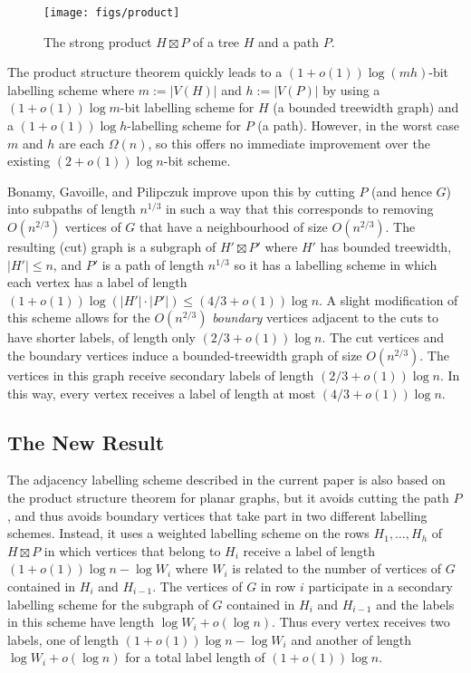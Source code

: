 \documentclass[kpfonts]{patmorin}
\let\le\leqslant
\begin{document}
\begin{figure}[htbp]
  \begin{center}
    \texttt{[image: figs/product]}
  \end{center}
  \caption{The strong product $H\boxtimes P$ of a tree $H$ and a path $P$.}
\end{figure}  

The product structure theorem quickly leads to a $(1+o(1))\log(mh)$-bit labelling scheme where $m:=|V(H)|$ and $h:=|V(P)|$ by using a $(1+o(1))\log m$-bit labelling scheme for $H$ (a bounded treewidth graph) and a $(1+o(1))\log h$-labelling scheme for $P$ (a path).  However, in the worst case $m$ and $h$ are each $\Omega(n)$, so this offers no immediate improvement over the existing $(2+o(1))\log n$-bit scheme.

Bonamy, Gavoille, and Pilipczuk improve upon this by cutting $P$ (and hence $G$) into subpaths of length $n^{1/3}$ in such a way that this corresponds to removing $O(n^{2/3})$ vertices of $G$ that have a neighbourhood of size $O(n^{2/3})$. The resulting (cut) graph is a subgraph of $H'\boxtimes P'$ where $H'$ has bounded treewidth, $|H'|\le n$, and $P'$ is a path of length $n^{1/3}$ so it has a labelling scheme in which each vertex has a label of length $(1+o(1))\log (|H'|\cdot|P'|) \le (4/3+o(1))\log n$.  A slight modification of this scheme allows for the $O(n^{2/3})$ \emph{boundary} vertices adjacent to the cuts to have shorter labels, of length only $(2/3+o(1))\log n$.  The cut vertices and the boundary vertices induce a bounded-treewidth graph of size $O(n^{2/3})$.  The vertices in this graph receive secondary labels of length $(2/3+o(1))\log n$.  In this way, every vertex receives a label of length at most $(4/3 + o(1))\log n$.

\subsection{The New Result}

The adjacency labelling scheme described in the current paper is also based on the product structure theorem for planar graphs, but it avoids cutting the path $P$, and thus avoids boundary vertices that take part in two different labelling schemes.  Instead, it uses a weighted labelling scheme on the rows $H_1,\ldots,H_h$ of $H\boxtimes P$ in which vertices that belong to $H_i$ receive a label of length $(1+o(1))\log n-\log W_i$ where $W_i$ is related to the number of vertices of $G$ contained in $H_i$ and $H_{i-1}$.  The vertices of $G$ in row $i$ participate in a secondary labelling scheme for the subgraph of $G$ contained in $H_i$ and $H_{i-1}$ and the labels in this scheme have length $\log W_i + o(\log n)$. Thus every vertex receives two labels, one of length $(1+o(1))\log n-\log W_i$ and another of length $\log W_i + o(\log n)$ for a total label length of $(1+o(1))\log n$.  
\end{document}
